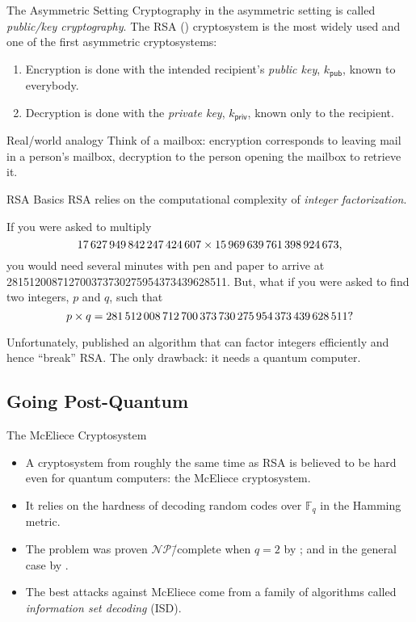 \documentclass[usepdftitle=false]{beamer}
\newcommand*{\pub}{\ensuremath{\mathsf{pub}}}
\newcommand*{\priv}{\ensuremath{\mathsf{priv}}}
\newcommand*{\FF}{\ensuremath{\mathbb{F}}}
\newcommand*{\NP}{\ensuremath{\mathcal{NP}}}
\begin{document}
\begin{frame}{The Asymmetric Setting}
  Cryptography in the asymmetric setting is called \emph{public\-/key
    cryptography}.  The RSA (\textcite{RSA78}) cryptosystem is the
  most widely used and one of the first asymmetric cryptosystems:
  \begin{enumerate}
  \item Encryption is done with the intended recipient's \emph{public
      key}, \(k_{\pub}\), known to everybody.
  \item Decryption is done with the \emph{private key}, \(k_{\priv}\),
    known only to the recipient.
  \end{enumerate}
  \begin{block}{Real\-/world analogy}
    Think of a mailbox: encryption corresponds to leaving mail in a
    person's mailbox, decryption to the person opening the mailbox to
    retrieve it.
  \end{block}
\end{frame}

\begin{frame}{RSA Basics}
  RSA relies on the computational complexity of \emph{integer
    factorization}.
  \begin{example}
    If you were asked to multiply
    \[
      \num{17627949842247424607} \times \num{15969639761398924673}\text,
    \]
    you would need several minutes with pen and paper to arrive at
    \num{281512008712700373730275954373439628511}.  But, what if you
    were asked to find two integers, \(p\) and \(q\), such that
    \[
      p \times q = \num{281512008712700373730275954373439628511}\text?
    \]
  \end{example}
  Unfortunately, \textcite{Sho97} published an algorithm that can
  factor integers efficiently and hence \enquote{break} RSA\@.  The
  only drawback: it needs a \alert{quantum computer}.
\end{frame}

\subsection{Going Post-Quantum}

\begin{frame}{The McEliece Cryptosystem}
  \begin{itemize}
  \item A cryptosystem from roughly the same time as RSA is believed
    to be hard even for quantum computers: the McEliece cryptosystem.
  \item It relies on the hardness of decoding random codes over
    \(\FF_q\) in the Hamming metric.
  \item The problem was proven \NP\=/complete when \(q = 2\) by
    \textcite{BEvT78}; and in the general case by \textcite{Bar94}.
  \item The best attacks against McEliece come from a family of
    algorithms called \emph{information set decoding} (ISD).
  \end{itemize}
\end{frame}
\end{document}
